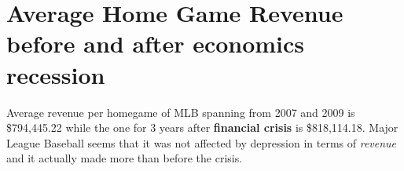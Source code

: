 \documentclass[man, fleqn, noextraspace,floatsintext]{apa6}
\newenvironment{Shaded}{\begin{snugshade}}{\end{snugshade}}
\newcommand{\DataTypeTok}[1]{\textcolor[rgb]{0.13,0.29,0.53}{#1}}
\newcommand{\DecValTok}[1]{\textcolor[rgb]{0.00,0.00,0.81}{#1}}
\newcommand{\KeywordTok}[1]{\textcolor[rgb]{0.13,0.29,0.53}{\textbf{#1}}}
\newcommand{\NormalTok}[1]{#1}
\newcommand{\OperatorTok}[1]{\textcolor[rgb]{0.81,0.36,0.00}{\textbf{#1}}}
\newcommand{\OtherTok}[1]{\textcolor[rgb]{0.56,0.35,0.01}{#1}}
\newcommand{\StringTok}[1]{\textcolor[rgb]{0.31,0.60,0.02}{#1}}
\begin{document}
\begin{Shaded}
\end{Shaded}

\hypertarget{average-home-game-revenue-before-and-after-economics-recession}{%
\section{Average Home Game Revenue before and after economics recession}\label{average-home-game-revenue-before-and-after-economics-recession}}

Average revenue per homegame of MLB spanning from 2007 and 2009 is \$794,445.22 while the one for 3 years after \textbf{financial crisis} is \$818,114.18. Major League Baseball seems that it was not affected by depression in terms of \emph{revenue} and it actually made more than before the crisis.
\end{document}
